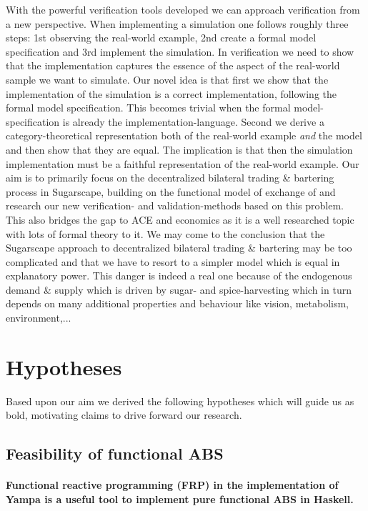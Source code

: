 With the powerful verification tools developed we can approach verification from a new perspective. When implementing a simulation one follows roughly three steps: 1st observing the real-world example, 2nd create a formal model specification and 3rd implement the simulation. In verification we need to show that the implementation captures the essence of the aspect of the real-world sample we want to simulate. Our novel idea is that first we show that the implementation of the simulation is a correct implementation, following the formal model specification. This becomes trivial when the formal model-specification is already the implementation-language. Second we derive a category-theoretical representation both of the real-world example \textit{and} the model and then show that they are equal. The implication is that then the simulation implementation must be a faithful representation of the real-world example.
Our aim is to primarily focus on the decentralized bilateral trading \& bartering process in Sugarscape, building on the functional model of exchange of \cite{botta_functional_2011} and research our new verification- and validation-methods based on this problem. This also bridges the gap to ACE and economics as it is a well researched topic with lots of formal theory to it. We may come to the conclusion that the Sugarscape approach to decentralized bilateral trading \& bartering may be too complicated and that we have to resort to a simpler model which is equal in explanatory power. This danger is indeed a real one because of the endogenous demand \& supply which is driven by sugar- and spice-harvesting which in turn depends on many additional properties and behaviour like vision, metabolism, environment,...

\section{Hypotheses}
Based upon our aim we derived the following hypotheses which will guide us as bold, motivating claims to drive forward our research.

\subsection{Feasibility of functional ABS}
\paragraph{Functional reactive programming (FRP) in the implementation of Yampa is a useful tool to implement pure functional ABS in Haskell.}
